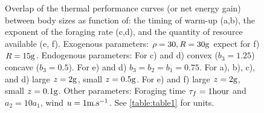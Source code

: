 \begin{figure}%
\begin{center}
\caption{
	Overlap of the thermal performance curves (or net energy gain) between body sizes as function of: the timing of warm-up (a,b), the exponent of the foraging rate (c,d), and the quantity of resource available (e, f).
	Exogenous parameters:
	$\rho = 30, R = 30 \rm{g}$ expect for f) $R = 15 \rm{g}$.
	Endogenous parameters:
	For c) and d) convex ($b_3 = 1.25$) concave ($b_3 = 0.5$).
	For e) and d) $b_3 = b_2 = b_1 = 0.75$.
	For a), b), c), and d) large $z = 2 \rm{g}$, small $z = 0.5 \rm{g}$.
	For e) and f) large $z = 2 \rm{g}$, small $z = 0.1 \rm{g}$.
	Other parameters:
	Foraging time $\tau_f = 1 \rm{hour}$ and $a_2 = 10 a_1$, wind $u = 1 \rm{m.s^{-1}}$.
	See \cref{table:table1} for units.
}
\label{fig5}
\end{center}
\end{figure}


